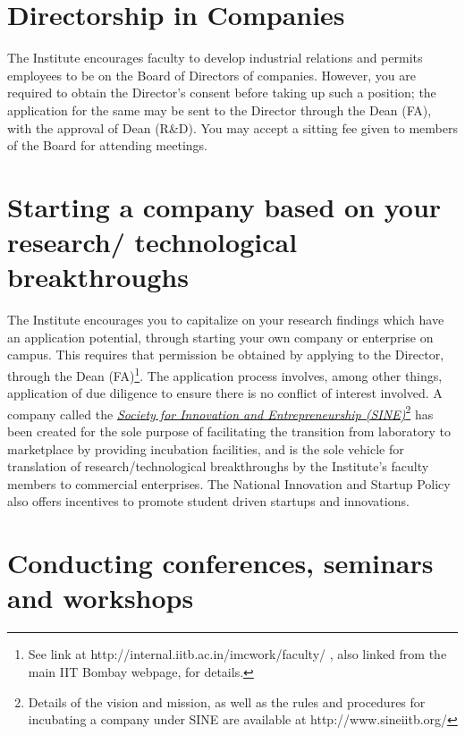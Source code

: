 \documentclass[
  10pt,
  a5paper,
  10pt,
  openany]{amsbook}
\begin{document}
\chapter{Directorship in Companies}\label{directorship-in-companies}

The Institute encourages faculty to develop industrial relations and
permits employees to be on the Board of Directors of companies. However,
you are required to obtain the Director's consent before taking up such
a position; the application for the same may be sent to the Director
through the Dean (FA), with the approval of Dean (R\&D). You may accept
a sitting fee given to members of the Board for attending meetings.

\chapter{Starting a company based on your research/ technological
breakthroughs}\label{starting-a-company-based-on-your-research-technological-breakthroughs}

The Institute encourages you to capitalize on your research findings
which have an application potential, through starting your own company
or enterprise on campus. This requires that permission be obtained by
applying to the Director, through the Dean (FA)\footnote{See link at
  http://internal.iitb.ac.in/imcwork/faculty/ , also linked from the
  main IIT Bombay webpage, for details.}. The application process
involves, among other things, application of due diligence to ensure
there is no conflict of interest involved. A company called the
\href{https://sineiitb.org/}{\emph{Society for Innovation and
Entrepreneurship (SINE)}}\footnote{Details of the vision and mission, as
  well as the rules and procedures for incubating a company under SINE
  are available at http://www.sineiitb.org/} has been created for the
sole purpose of facilitating the transition from laboratory to
marketplace by providing incubation facilities, and is the sole vehicle
for translation of research/technological breakthroughs by the
Institute's faculty members to commercial enterprises. The National
Innovation and Startup Policy also offers incentives to promote student
driven startups and innovations.

\chapter{Conducting conferences, seminars and
workshops}\label{conducting-conferences-seminars-and-workshops}
\end{document}
